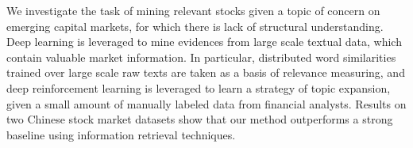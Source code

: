 We investigate the task of mining relevant stocks given a topic of concern on emerging capital markets, for which there is lack of structural understanding. Deep learning is leveraged to mine evidences from large scale textual data, which contain valuable market information. In particular, distributed word similarities trained over large scale raw texts are taken as a basis of relevance measuring, and deep reinforcement learning is leveraged to learn a strategy of topic expansion, given a small amount of manually labeled data from financial analysts. Results on two Chinese stock market datasets show that our method outperforms a strong baseline using information retrieval techniques.
